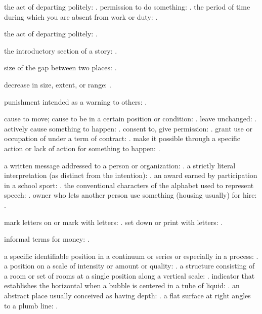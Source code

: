   the act of departing politely: . permission to do something: . the period of time during which you are absent from work or duty: .

  the act of departing politely: .

  the introductory section of a story: .

  size of the gap between two places: .

  decrease in size, extent, or range: .

  punishment intended as a warning to others: .

  cause to move; cause to be in a certain position or condition: . leave unchanged: . actively cause something to happen: . consent to, give permission: . grant use or occupation of under a term of contract: . make it possible through a specific action or lack of action for something to happen: .

  a written message addressed to a person or organization: . a strictly literal interpretation (as distinct from the intention): . an award earned by participation in a school sport: . the conventional characters of the alphabet used to represent speech: . owner who lets another person use something (housing usually) for hire: .

  mark letters on or mark with letters: . set down or print with letters: .

  informal terms for money: .

  a specific identifiable position in a continuum or series or especially in a process: . a position on a scale of intensity or amount or quality: . a structure consisting of a room or set of rooms at a single position along a vertical scale: . indicator that establishes the horizontal when a bubble is centered in a tube of liquid: . an abstract place usually conceived as having depth: . a flat surface at right angles to a plumb line: .

